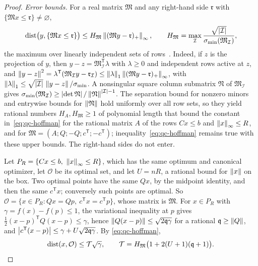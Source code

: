 \begin{proof}
\emph{Error bounds.} For a real matrix $\mathfrak M$ and any right-hand side
$\mathfrak r$ with $\{\mathfrak Mx\le\mathfrak r\}\ne\varnothing$,
\begin{equation}
\label{eq:qc-hoffman}
\operatorname{dist}\bigl(y,\{\mathfrak Mx\le\mathfrak r\}\bigr)\le
H_{\mathfrak M}\left\lVert(\mathfrak My-\mathfrak r)_+\right\rVert_\infty,\qquad
H_{\mathfrak M}=\max_{\mathcal I}\frac{\sqrt{\left\lvert\mathcal I\right\rvert}}
{\sigma_{\min}(\mathfrak M_{\mathcal I})},
\end{equation}
the maximum over linearly independent sets of rows~\cite{Hoffman1952}. Indeed,
if $z$ is the projection of $y$, then $y-z=\mathfrak M_{\mathcal I}^{\mathsf
T}\lambda$ with $\lambda\ge0$ and independent rows active at $z$, and
$\left\lVert y-z\right\rVert^2=\lambda^{\mathsf T}(\mathfrak M_{\mathcal I}y-\mathfrak
r_{\mathcal I})\le\left\lVert\lambda\right\rVert_1\left\lVert(\mathfrak My-\mathfrak r)_+\right\rVert_\infty$,
with $\left\lVert\lambda\right\rVert_1\le\sqrt{\left\lvert\mathcal I\right\rvert}\,\left\lVert y-z\right\rVert/\sigma_{\min}$. A
nonsingular square column submatrix $\mathfrak N$ of $\mathfrak M_{\mathcal
I}$ gives $\sigma_{\min}(\mathfrak M_{\mathcal I})\ge\left\lvert\det\mathfrak N\right\rvert/
\left\lVert\mathfrak N\right\rVert^{\left\lvert\mathcal I\right\rvert-1}$. The separation bound for nonzero
minors and entrywise bounds for $\left\lVert\mathfrak N\right\rVert$ hold uniformly over all
row sets, so they yield rational numbers $H_A,H_{\mathfrak M}\ge1$ of
polynomial length that bound the constant in~\eqref{eq:qc-hoffman} for the
rational matrix $A$ of the rows $Cx\le b$ and $\left\lVert x\right\rVert_\infty\le R$, and for
$\mathfrak M=(A;Q;-Q;c^{\mathsf T};-c^{\mathsf T})$;
inequality~\eqref{eq:qc-hoffman} remains true with these upper bounds. The
right-hand sides do not enter.

Let $P_R=\{Cx\le b,\ \left\lVert x\right\rVert_\infty\le R\}$, which has the same optimum and
canonical optimizer, let $\mathcal O$ be its optimal set, and let $U=nR$, a
rational bound for $\left\lVert x\right\rVert$ on the box. Two optimal points have the same
$Qx$, by the midpoint identity, and then the same $c^{\mathsf T}x$;
conversely such points are optimal. So $\mathcal O=\{x\in P_R:Qx=Qp,\ c^{\mathsf T}x=c^{\mathsf T}p\}$,
whose matrix is $\mathfrak M$. For $x\in P_R$ with $\gamma=f(x)-f(p)\le1$, the
variational inequality at $p$ gives $\tfrac12(x-p)^{\mathsf T}Q(x-p)\le\gamma$,
hence $\left\lVert Q(x-p)\right\rVert\le\sqrt{2\mathfrak q\gamma}$ for a rational
$\mathfrak q\ge\left\lVert Q\right\rVert$, and
$\left\lvert c^{\mathsf T}(x-p)\right\rvert\le\gamma+U\sqrt{2\mathfrak q\gamma}$. By
\eqref{eq:qc-hoffman},
\[
\operatorname{dist}(x,\mathcal O)\le\mathcal T\sqrt\gamma,\qquad
\mathcal T=H_{\mathfrak M}\bigl(1+2(U+1)(\mathfrak q+1)\bigr).
\]


\end{proof}
